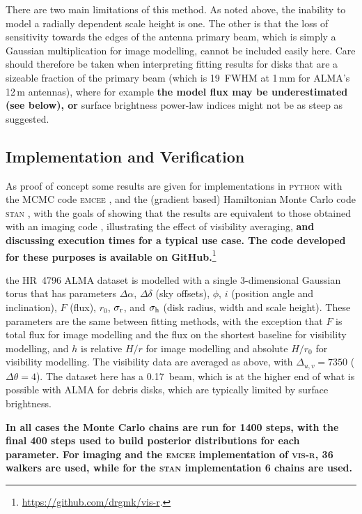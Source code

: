 \documentclass[fleqn,usenatbib]{mnras}
\begin{document}
There are two main limitations of this method. As noted above, the inability to model a radially dependent scale height is one. The other is that the loss of sensitivity towards the edges of the antenna primary beam, which is simply a Gaussian multiplication for image modelling, cannot be included easily here. Care should therefore be taken when interpreting fitting results for disks that are a sizeable fraction of the primary beam (which is 19\arcsec~FWHM at 1\,mm for ALMA's 12\,m antennas), where for example \textbf{the model flux may be underestimated (see below), or} surface brightness power-law indices might not be as steep as suggested.

\subsection{ Implementation and Verification}

As proof of concept some results are given for implementations in \textsc{python} with the MCMC code \textsc{emcee} \citep{2013PASP..125..306F}, and the (gradient based) Hamiltonian Monte Carlo code \textsc{stan} \citep{2017JSS....76....1C}, with the goals of showing that the results are equivalent to those obtained with an imaging code \citep[e.g.][]{2021MNRAS.504.4497C}, illustrating the effect of visibility averaging, \textbf{and discussing execution times for a typical use case. The code developed for these purposes is available on GitHub.}\footnote{\href{https://github.com/drgmk/vis-r}{https://github.com/drgmk/vis-r}.}

 the HR~4796 ALMA dataset is modelled with a single 3-dimensional Gaussian torus that has parameters $\Delta \alpha$, $\Delta \delta$ (sky offsets), $\phi$, $i$ (position angle and inclination), $F$ (flux), $r_0$, $\sigma_{\rm r}$, and $\sigma_{\rm h}$ (disk radius, width and scale height). These parameters are the same between fitting methods, with the exception that $F$ is total flux for image modelling and the flux on the shortest baseline for visibility modelling, and $h$ is relative $H/r$ for image modelling and absolute $H/r_0$ for visibility modelling. The visibility data are averaged as above, with $\Delta_{u,v} = 7350$ ($\Delta \theta = 4$). The dataset here has a 0.17\arcsec~beam, which is at the higher end of what is possible with ALMA for debris disks, which are typically limited by surface brightness.

\textbf{In all cases the Monte Carlo chains are run for 1400 steps, with the final 400 steps used to build posterior distributions for each parameter. For imaging and the \textsc{emcee} implementation of \textsc{vis-r}, 36 walkers are used, while for the \textsc{stan} implementation 6 chains are used.}
\end{document}
